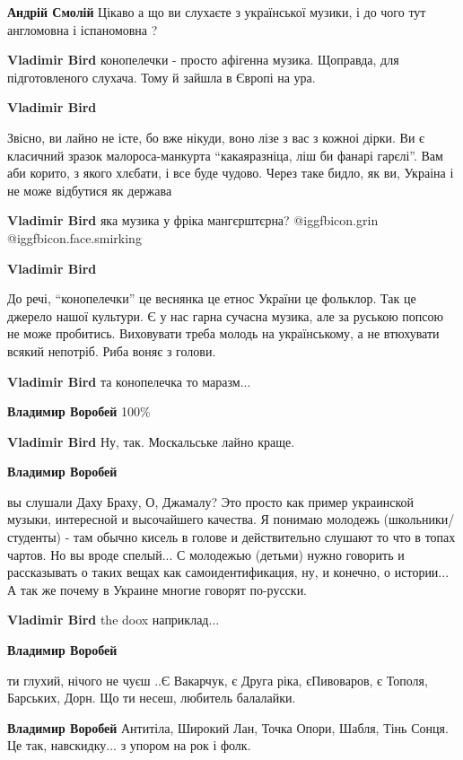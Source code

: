 \begin{itemize}
\begin{itemize}
\textbf{Андрій Смолій} Цікаво а що ви слухаєте з української музики, і до чого тут англомовна і іспаномовна ?

\textbf{Vladimir Bird} конопелечки - просто афігенна музика. Щоправда, для підготовленого слухача. Тому й зайшла в Європі на ура.

\textbf{Vladimir Bird} 

Звісно, ви лайно не істе, бо вже нікуди, воно лізе з вас з кожноі дірки. Ви є
класичний зразок малороса-манкурта \enquote{какаяразніца, ліш би фанарі гарєлі}. Вам
аби корито, з якого хлєбати, і все буде чудово. Через таке бидло, як ви,
Украіна і не може відбутися як держава

\textbf{Vladimir Bird} яка музика у фріка мангєрштєрна? @igg{fbicon.grin}  @igg{fbicon.face.smirking} 

\textbf{Vladimir Bird} 

До речі, \enquote{конопелечки} це веснянка це етнос України це фольклор. Так це
джерело нашої культури. Є у нас гарна сучасна музика, але за руською попсою не
може пробитись. Виховувати треба молодь на українському, а не втюхувати всякий
непотріб. Риба воняє з голови.


\textbf{Vladimir Bird} та конопелечка то маразм...

\textbf{Владимир Воробей} 100\%

\textbf{Vladimir Bird} Ну, так. Москальське лайно краще.

\textbf{Владимир Воробей} 

вы слушали Даху Браху, О, Джамалу? Это просто как пример украинской музыки,
интересной и высочайшего качества. Я понимаю молодежь (школьники/студенты) -
там обычно кисель в голове и действительно слушают то что в топах чартов. Но вы
вроде спелый... С молодежью (детьми) нужно говорить и рассказывать о таких
вещах как самоидентификация, ну, и конечно, о истории... А так же почему в
Украине многие говорят по-русски.

\textbf{Vladimir Bird} the doox наприклад...

\textbf{Владимир Воробей} 

ти глухий, нічого не чуєш ..Є Вакарчук, є Друга ріка, єПивоваров, є
Тополя, Барських, Дорн. Що ти несеш, любитель балалайки.

\textbf{Владимир Воробей} Антитіла, Широкий Лан, Точка Опори, Шабля, Тінь Сонця. Це так, навскидку... з упором на рок і фолк.


\end{itemize}
\end{itemize}
